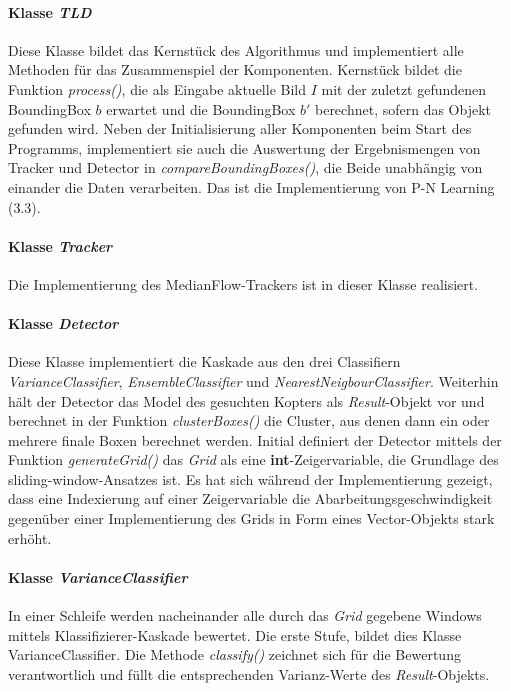 \paragraph{Klasse \textit{TLD}}
Diese Klasse bildet das Kernstück des Algorithmus und implementiert alle Methoden für das Zusammenspiel der Komponenten. Kernstück bildet die Funktion \textit{process()}, die als Eingabe aktuelle Bild $I$ mit der zuletzt gefundenen BoundingBox $b$ erwartet und die BoundingBox $b'$ berechnet, sofern das Objekt gefunden wird. Neben der Initialisierung aller Komponenten beim Start des Programms, implementiert sie auch die Auswertung der Ergebnismengen von Tracker und Detector in \textit{compareBoundingBoxes()}, die Beide unabhängig von einander die Daten verarbeiten. Das ist die Implementierung von P-N Learning (3.3).

\paragraph{Klasse \textit{Tracker}}
Die Implementierung des MedianFlow-Trackers ist in dieser Klasse realisiert.

\paragraph{Klasse \textit{Detector}}
Diese Klasse implementiert die Kaskade aus den drei Classifiern \textit{VarianceClassifier}, \textit{EnsembleClassifier} und \textit{NearestNeigbourClassifier}. Weiterhin hält der Detector das Model des gesuchten Kopters als \textit{Result}-Objekt vor und berechnet in der Funktion \textit{clusterBoxes()} die Cluster, aus denen dann ein oder mehrere finale Boxen berechnet werden. Initial definiert der Detector mittels der Funktion \textit{generateGrid()} das \textit{Grid} als eine \textbf{int}-Zeigervariable, die Grundlage des sliding-window-Ansatzes ist. Es hat sich während der Implementierung gezeigt, dass eine Indexierung auf einer Zeigervariable die Abarbeitungsgeschwindigkeit gegenüber einer Implementierung des Grids in Form eines Vector-Objekts stark erhöht.

\paragraph{Klasse \textit{VarianceClassifier}}
In einer Schleife werden nacheinander alle durch das \textit{Grid} gegebene Windows mittels Klassifizierer-Kaskade bewertet. Die erste Stufe, bildet dies Klasse VarianceClassifier. Die Methode \textit{classify()} zeichnet sich für die Bewertung verantwortlich und füllt die entsprechenden Varianz-Werte des \textit{Result}-Objekts.

